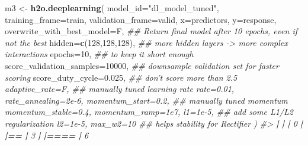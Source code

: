 \documentclass[]{book}
\newenvironment{Shaded}{\begin{snugshade}}{\end{snugshade}}
\newcommand{\CommentTok}[1]{\textcolor[rgb]{0.56,0.35,0.01}{\textit{#1}}}
\newcommand{\DataTypeTok}[1]{\textcolor[rgb]{0.13,0.29,0.53}{#1}}
\newcommand{\DecValTok}[1]{\textcolor[rgb]{0.00,0.00,0.81}{#1}}
\newcommand{\ErrorTok}[1]{\textcolor[rgb]{0.64,0.00,0.00}{\textbf{#1}}}
\newcommand{\FloatTok}[1]{\textcolor[rgb]{0.00,0.00,0.81}{#1}}
\newcommand{\KeywordTok}[1]{\textcolor[rgb]{0.13,0.29,0.53}{\textbf{#1}}}
\newcommand{\NormalTok}[1]{#1}
\newcommand{\OperatorTok}[1]{\textcolor[rgb]{0.81,0.36,0.00}{\textbf{#1}}}
\newcommand{\StringTok}[1]{\textcolor[rgb]{0.31,0.60,0.02}{#1}}
\begin{document}
\begin{Shaded}
\begin{Highlighting}[]
\NormalTok{m3 <-}\StringTok{ }\KeywordTok{h2o.deeplearning}\NormalTok{(}
  \DataTypeTok{model_id=}\StringTok{"dl_model_tuned"}\NormalTok{, }
  \DataTypeTok{training_frame=}\NormalTok{train, }
  \DataTypeTok{validation_frame=}\NormalTok{valid, }
  \DataTypeTok{x=}\NormalTok{predictors, }
  \DataTypeTok{y=}\NormalTok{response, }
  \DataTypeTok{overwrite_with_best_model=}\NormalTok{F,    }\CommentTok{## Return final model after 10 epochs, even if not the best}
  \DataTypeTok{hidden=}\KeywordTok{c}\NormalTok{(}\DecValTok{128}\NormalTok{,}\DecValTok{128}\NormalTok{,}\DecValTok{128}\NormalTok{),          }\CommentTok{## more hidden layers -> more complex interactions}
  \DataTypeTok{epochs=}\DecValTok{10}\NormalTok{,                      }\CommentTok{## to keep it short enough}
  \DataTypeTok{score_validation_samples=}\DecValTok{10000}\NormalTok{, }\CommentTok{## downsample validation set for faster scoring}
  \DataTypeTok{score_duty_cycle=}\FloatTok{0.025}\NormalTok{,         }\CommentTok{## don't score more than 2.5% of the wall time}
  \DataTypeTok{adaptive_rate=}\NormalTok{F,                }\CommentTok{## manually tuned learning rate}
  \DataTypeTok{rate=}\FloatTok{0.01}\NormalTok{, }
  \DataTypeTok{rate_annealing=}\FloatTok{2e-6}\NormalTok{,            }
  \DataTypeTok{momentum_start=}\FloatTok{0.2}\NormalTok{,             }\CommentTok{## manually tuned momentum}
  \DataTypeTok{momentum_stable=}\FloatTok{0.4}\NormalTok{, }
  \DataTypeTok{momentum_ramp=}\FloatTok{1e7}\NormalTok{, }
  \DataTypeTok{l1=}\FloatTok{1e-5}\NormalTok{,                        }\CommentTok{## add some L1/L2 regularization}
  \DataTypeTok{l2=}\FloatTok{1e-5}\NormalTok{,}
  \DataTypeTok{max_w2=}\DecValTok{10}                       \CommentTok{## helps stability for Rectifier}
\NormalTok{) }
\CommentTok{#> }
  \OperatorTok{|}\StringTok{                                                                       }
\StringTok{  }\ErrorTok{|}\StringTok{                                                                 }\ErrorTok{|}\StringTok{   }\DecValTok{0}\NormalTok{%}
  \OperatorTok{|}\StringTok{                                                                       }
\StringTok{  }\ErrorTok{|==}\StringTok{                                                               }\ErrorTok{|}\StringTok{   }\DecValTok{3}\NormalTok{%}
  \OperatorTok{|}\StringTok{                                                                       }
\StringTok{  }\ErrorTok{|====}\StringTok{                                                             }\ErrorTok{|}\StringTok{   }\DecValTok{6}\NormalTok{%}
}}}}
\end{Highlighting}
\end{Shaded}
\end{document}
